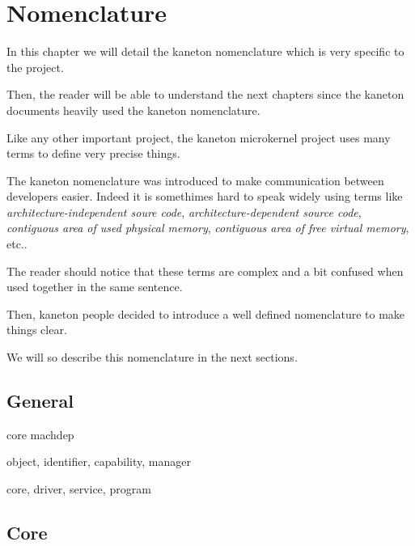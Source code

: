 
%
%

\chapter{Nomenclature}

In this chapter we will detail the kaneton nomenclature which is very
specific to the project.

Then, the reader will be able to understand the next chapters since the
kaneton documents heavily used the kaneton nomenclature.

\newpage

%
%

Like any other important project, the kaneton microkernel project
uses many terms to define very precise things.

The kaneton nomenclature was introduced to make communication between
developers easier. Indeed it is somethimes hard to speak widely using
terms like \textit{architecture-independent soure code},
\textit{architecture-dependent source code},
\textit{contiguous area of used physical memory},
\textit{contiguous area of free virtual memory}, etc..

The reader should notice that these terms are complex and a bit confused
when used together in the same sentence.

Then, kaneton people decided to introduce a well defined nomenclature
to make things clear.

We will so describe this nomenclature in the next sections.

%
%

\section{General}

core machdep

object, identifier, capability, manager

core, driver, service, program

%
%

\section{Core}

